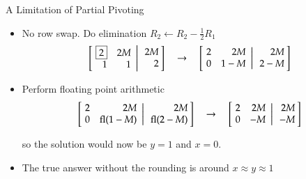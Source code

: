 \documentclass[10pt]{beamer}
\begin{document}
\begin{frame}{A Limitation of Partial Pivoting}
\begin{itemize}
\item No row swap. Do elimination $R_2 \leftarrow R_2 -\frac{1}{2}R_1$
\begin{equation*}
        \left[\left.\negthickspace\begin{array}{rr}  \boxed{2} &  2M\\
                                                        1 &  1\end{array}
               \right|\begin{array}{r} 2M \\ 2\end{array}\negthickspace\right]
               \quad\rightarrow\quad 
    \left[ \left.\negthickspace\begin{array}{rr}  2 &  2M\\
                                                    0 &  1-M\end{array}
           \right|\begin{array}{r} 2M \\ 2-M\end{array}\negthickspace\right]
\end{equation*}
\item Perform floating point arithmetic 
\begin{equation*}
    \left[ \left.\negthickspace\begin{array}{rr}  2 &  2M\\
                                                    0 &  \text{fl}(1-M)\end{array}
           \right|\begin{array}{r} 2M \\ \text{fl}(2-M)\end{array}\negthickspace\right]
               \quad\rightarrow\quad 
    \left[ \left.\negthickspace\begin{array}{rr}  2 &  2M\\
                                                    0 &  -M\end{array}
           \right|\begin{array}{r} 2M \\ -M\end{array}\negthickspace\right]
\end{equation*}

so  the solution would now be $y = 1$ and $x=0$.
\item The true answer without the rounding is around $x\approx y \approx 1$
\end{itemize}
\end{frame}
\end{document}
